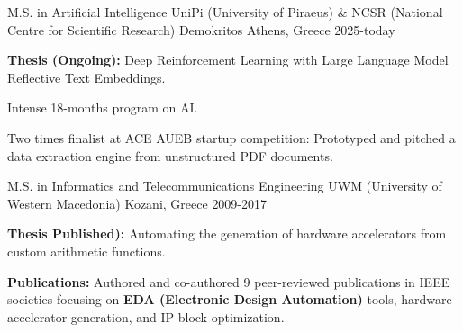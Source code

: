 
\begin{cventries}

\cventry
    {M.S. in Artificial Intelligence} %
    {UniPi (University of Piraeus) \& NCSR (National Centre for Scientific Research) Demokritos} %
    {Athens, Greece} %
    {2025-today} %
{
\begin{cvitems}
\item {\textbf{Thesis (Ongoing):} Deep Reinforcement Learning with Large Language Model Reflective Text Embeddings.}
\item {Intense 18-months program on AI.}
\item {Two times finalist at ACE AUEB startup competition: Prototyped and pitched a data extraction engine from unstructured PDF documents.}
\end{cvitems}
}

\cventry
{M.S. in Informatics and Telecommunications Engineering} %
{UWM (University of Western Macedonia)} %
{Kozani, Greece} %
{2009-2017} %
{
\begin{cvitems}
\item {\textbf{Thesis {Published)}:} Automating the generation of hardware accelerators from custom arithmetic functions.}
\item {\textbf{Publications:} Authored and co-authored 9 peer-reviewed publications in IEEE societies focusing on \textbf{EDA (Electronic Design Automation)} tools, hardware accelerator generation, and IP block optimization.}
\end{cvitems}
}

\end{cventries}
